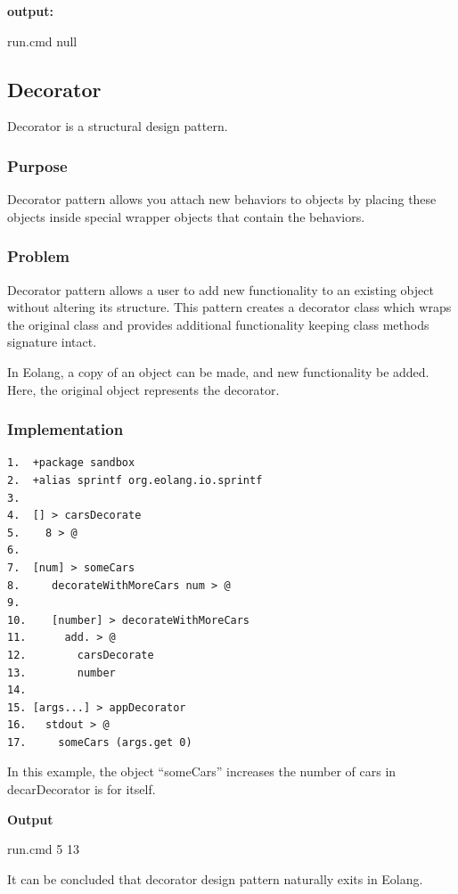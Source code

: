 \documentclass[sigplan,12pt,nonacm=true,review=false]{acmart}
\begin{document}
\textbf{output:}


run.cmd
null

\subsection{Decorator}
Decorator is a structural design pattern.

\subsubsection{Purpose}
Decorator pattern allows you attach new behaviors to objects by placing these objects inside special wrapper objects that contain the behaviors.

\subsubsection{Problem}
Decorator pattern allows a user to add new functionality to an existing object without altering its structure. This pattern creates a decorator class which wraps the original class and provides additional functionality keeping class methods signature intact.


In Eolang, a copy of an object can be made, and new functionality be added. Here, the original object represents the decorator.

\subsubsection{Implementation}
\begin{verbatim}
1.	+package sandbox
2.	+alias sprintf org.eolang.io.sprintf
3.	
4.	[] > carsDecorate
5.	  8 > @
6.	
7.	[num] > someCars
8.	   decorateWithMoreCars num > @
9.	
10.	   [number] > decorateWithMoreCars
11.	     add. > @
12.	       carsDecorate
13.	       number
14.	
15.	[args...] > appDecorator
16.	  stdout > @
17.	    someCars (args.get 0) 

\end{verbatim}

In this example, the object “someCars” increases the number of cars in decarDecorator is for itself.

\textbf{Output}


run.cmd 5
13

It can be concluded that decorator design pattern naturally exits in Eolang.
\end{document}
